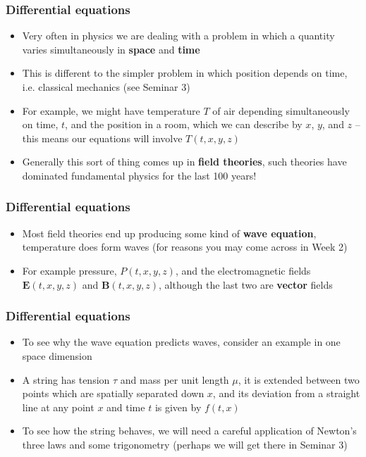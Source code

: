 \documentclass{beamer}
\begin{document}
\begin{frame}
  \frametitle{Differential equations}
  \begin{itemize}
    \item<1-> Very often in physics we are dealing with a problem in which a quantity varies simultaneously in \textbf{space} and \textbf{time}
    \item<2-> This is different to the simpler problem in which position depends on time, i.e. classical mechanics (see Seminar 3)
    \item<3-> For example, we might have temperature $T$ of air depending simultaneously on time, $t$, and the position in a room, which we can describe by $x$, $y$, and $z$ -- this means our equations will involve $T(t,x,y,z)$
    \item<4-> Generally this sort of thing comes up in \textbf{field theories}, such theories have dominated fundamental physics for the last 100 years!
  \end{itemize}
\end{frame}

\begin{frame}
  \frametitle{Differential equations}
  \begin{itemize}
    \item<1-> Most field theories end up producing some kind of \textbf{wave equation}, temperature does  form waves (for reasons you may come across in Week 2)
    \item<2-> For example pressure, $P(t,x,y,z)$, and the electromagnetic fields $\mathbf{E}(t,x,y,z)$ and $\mathbf{B}(t,x,y,z)$, although the last two are \textbf{vector} fields
  \end{itemize}
\end{frame}

\begin{frame}
  \frametitle{Differential equations}
  \begin{itemize}
    \item<1-> To see why the wave equation predicts waves, consider an example in one space dimension
    \item<2-> A string has tension $\tau$ and mass per unit length $\mu$, it is extended between two points which are spatially separated down $x$, and its deviation from a straight line at any point $x$ and time $t$ is given by $f(t,x)$
    \item<3-> To see how the string behaves, we will need a careful application of Newton's three laws and some trigonometry (perhaps we will get there in Seminar 3)
  \end{itemize}
\end{frame}
\end{document}
